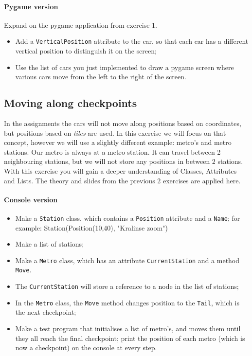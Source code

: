         \paragraph*{Pygame version}
        Expand on the pygame application from exercise 1.

        \begin{itemize}
            \item Add a \texttt{VerticalPosition} attribute to the car, so that each car has a different vertical position to distinguish it on the screen;
            \item Use the list of cars you just implemented to draw a pygame screen where various cars move from the left to the right of the screen.
        \end{itemize}

    \subsection{Moving along checkpoints}
        In the assignments the cars will not move along positions based on coordinates, but positions based on \textit{tiles} are used.
        In this exercise we will focus on that concept, however we will use a slightly different example: metro's and metro stations.
        Our metro is always at a metro station. It can travel between 2 neighbouring stations, but we will not store any positions in between 2 stations.
        With this exercise you will gain a deeper understanding of Classes, Attributes and Lists.
        The theory and slides from the previous 2 exercises are applied here.

        \paragraph*{Console version}
        \begin{itemize}
            \item Make a \texttt{Station} class,
            which contains a \texttt{Position} attribute and a \texttt{Name};
            for example: Station(Position(10,40), "Kralinse zoom")
            \item Make a list of stations;
            \item Make a \texttt{Metro} class,
            which has an attribute \texttt{CurrentStation} and a method \texttt{Move}.
            \item The \texttt{CurrentStation} will store a reference to a node in the list of stations;
            \item In the \texttt{Metro} class, the \texttt{Move} method changes position to the \texttt{Tail}, which is the next checkpoint;
            \item Make a test program that initialises a list of metro's, and moves them until they all reach the final checkpoint; print the position of each metro (which is now a checkpoint) on the console at every step.
        \end{itemize}


